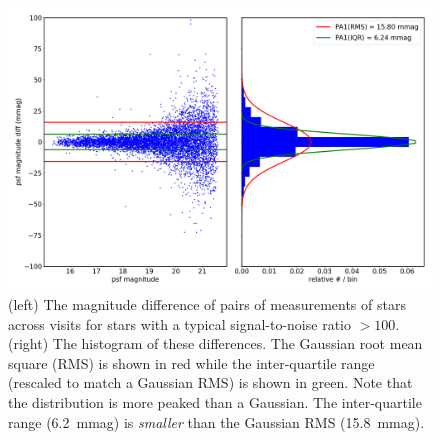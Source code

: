 \documentclass[twocolumn]{aastex62}
\begin{document}
\begin{figure}
\centering
\includegraphics[width=0.9\columnwidth]{DC1-imsim-dithered_r_PA1.png}
\caption{(left) The magnitude difference of pairs of measurements of stars across visits for stars with a typical signal-to-noise ratio $>100$.  (right) The histogram of these differences.  The Gaussian root mean square (RMS) is shown in red while the inter-quartile range (rescaled to match a Gaussian RMS) is shown in green.  Note that the distribution is more peaked than a Gaussian.  The inter-quartile range (6.2~mmag) is {\em smaller} than the Gaussian RMS (15.8~mmag).}
\label{fig:validate_drp_PA1}
\end{figure}
\end{document}
